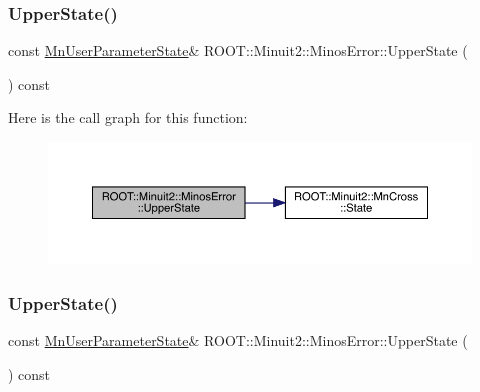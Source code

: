 \subsubsection{\texorpdfstring{UpperState()}{UpperState()}\hspace{0.1cm}{\footnotesize\ttfamily [1/3]}}
{\footnotesize\ttfamily const \mbox{\hyperlink{classROOT_1_1Minuit2_1_1MnUserParameterState}{Mn\+User\+Parameter\+State}}\& R\+O\+O\+T\+::\+Minuit2\+::\+Minos\+Error\+::\+Upper\+State (\begin{DoxyParamCaption}{ }\end{DoxyParamCaption}) const\hspace{0.3cm}{\ttfamily [inline]}}

Here is the call graph for this function\+:
\nopagebreak
\begin{figure}[H]
\begin{center}
\leavevmode
\includegraphics[width=350pt]{d2/dd1/classROOT_1_1Minuit2_1_1MinosError_a89164c38dd7596c3164f1083eb9aac72_cgraph}
\end{center}
\end{figure}
\mbox{\label{classROOT_1_1Minuit2_1_1MinosError_a89164c38dd7596c3164f1083eb9aac72}} 
\subsubsection{\texorpdfstring{UpperState()}{UpperState()}\hspace{0.1cm}{\footnotesize\ttfamily [2/3]}}
{\footnotesize\ttfamily const \mbox{\hyperlink{classROOT_1_1Minuit2_1_1MnUserParameterState}{Mn\+User\+Parameter\+State}}\& R\+O\+O\+T\+::\+Minuit2\+::\+Minos\+Error\+::\+Upper\+State (\begin{DoxyParamCaption}{ }\end{DoxyParamCaption}) const\hspace{0.3cm}{\ttfamily [inline]}}


